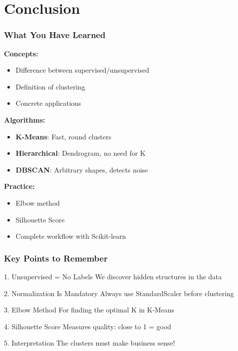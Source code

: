 \documentclass{beamer}
\begin{document}
\section{Conclusion}

\begin{frame}
\frametitle{What You Have Learned}
\textbf{Concepts:}
\begin{itemize}
    \item Difference between supervised/unsupervised
    \item Definition of clustering
    \item Concrete applications
\end{itemize}

\vspace{0.5em}
\textbf{Algorithms:}
\begin{itemize}
    \item \textbf{K-Means}: Fast, round clusters
    \item \textbf{Hierarchical}: Dendrogram, no need for K
    \item \textbf{DBSCAN}: Arbitrary shapes, detects noise
\end{itemize}

\vspace{0.5em}
\textbf{Practice:}
\begin{itemize}
    \item Elbow method
    \item Silhouette Score
    \item Complete workflow with Scikit-learn
\end{itemize}
\end{frame}

\begin{frame}
\frametitle{Key Points to Remember}
\begin{block}{1. Unsupervised = No Labels}
We discover hidden structures in the data
\end{block}

\vspace{0.5em}
\begin{block}{2. Normalization Is Mandatory}
Always use StandardScaler before clustering
\end{block}

\vspace{0.5em}
\begin{block}{3. Elbow Method}
For finding the optimal K in K-Means
\end{block}

\vspace{0.5em}
\begin{block}{4. Silhouette Score}
Measures quality: close to 1 = good
\end{block}

\vspace{0.5em}
\begin{block}{5. Interpretation}
The clusters must make business sense!
\end{block}
\end{frame}
\end{document}

